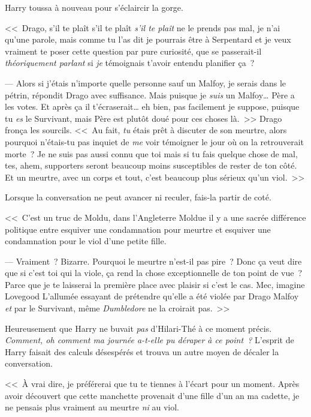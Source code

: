Harry toussa à nouveau pour s'éclaircir la gorge.

<<~Drago, s'il te plaît s'il te plaît \emph{s'il te plaît} ne le prends pas mal, je n'ai qu'une parole, mais comme tu l'as dit je pourrais être à Serpentard et je veux vraiment te poser cette question par pure curiosité, que se passerait-il \emph{théoriquement parlant} si \emph{je} témoignais t'avoir entendu planifier ça~?

--- Alors si j'étais n'importe quelle personne sauf un Malfoy, je serais dans le pétrin, répondit Drago avec suffisance. Mais puisque je \emph{suis} un Malfoy… Père a les votes. Et après ça il t'écraserait… eh bien, pas facilement je suppose, puisque tu \emph{es} le Survivant, mais Père est plutôt doué pour ces choses là.~>> Drago fronça les sourcils. <<~Au fait, \emph{tu} étais prêt à discuter de son meurtre, alors pourquoi n'étais-tu pas inquiet de \emph{me} voir témoigner le jour où on la retrouverait morte~? Je ne suis pas aussi connu que toi mais si tu fais quelque chose de mal, tes, ahem, supporters seront beaucoup moins susceptibles de rester de ton côté. Et un meurtre, avec un corps et tout, c'est beaucoup plus sérieux qu'un viol.~>>

Lorsque la conversation ne peut avancer ni reculer, fais-la partir de coté.

<<~C'est un truc de Moldu, dans l'Angleterre Moldue il y a une sacrée différence politique entre esquiver une condamnation pour meurtre et esquiver une condamnation pour le viol d'une petite fille.

--- Vraiment~? Bizarre. Pourquoi le meurtre n'est-il pas pire~? Donc ça veut dire que si c'est toi qui la viole, ça rend la chose exceptionnelle de ton point de vue~? Parce que je te laisserai la première place avec plaisir si c'est le cas. Mec, imagine Lovegood L'allumée essayant de prétendre qu'elle a été violée par Drago Malfoy \emph{et} par le Survivant, même \emph{Dumbledore} ne la croirait pas.~>>

Heureusement que Harry ne buvait \emph{pas} d'Hilari-Thé à ce moment précis. \emph{Comment, oh comment ma journée a-t-elle pu déraper à ce point~?} L'esprit de Harry faisait des calculs désespérés et trouva un autre moyen de décaler la conversation.

<<~À vrai dire, je préférerai que tu te tiennes à l'écart pour un moment. Après avoir découvert que cette manchette provenait d'une fille d'un an ma cadette, je ne pensais plus vraiment au meurtre \emph{ni} au viol.

